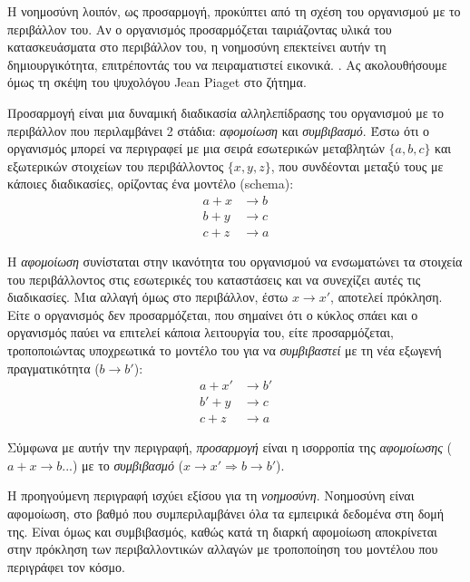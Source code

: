   Η νοημοσύνη λοιπόν, ως προσαρμογή, προκύπτει από τη σχέση του οργανισμού με το περιβάλλον του.
  Αν ο οργανισμός προσαρμόζεται ταιριάζοντας υλικά του κατασκευάσματα στο περιβάλλον του, η νοημοσύνη επεκτείνει αυτήν τη δημιουργικότητα, επιτρέποντάς του να πειραματιστεί εικονικά.
  \parencite[σελ 3]{piagetOriginsIntelligenceChildren1952}.
  Ας ακολουθήσουμε όμως τη σκέψη του ψυχολόγου Jean Piaget στο ζήτημα.

  Προσαρμογή είναι μια δυναμική διαδικασία αλληλεπίδρασης του οργανισμού με το περιβάλλον που περιλαμβάνει 2 στάδια: \textit{αφομοίωση} και \textit{συμβιβασμό}.
  Έστω ότι ο οργανισμός μπορεί να περιγραφεί με μια σειρά εσωτερικών μεταβλητών $\{a,b,c\}$ και εξωτερικών στοιχείων του περιβάλλοντος $\{x,y,z\}$,
  που συνδέονται μεταξύ τους με κάποιες διαδικασίες, ορίζοντας ένα μοντέλο (schema):
  \begin{align*}
    a + x &\rightarrow b\\
    b + y &\rightarrow c\\
    c + z &\rightarrow a
  \end{align*}

  Η \textit{αφομοίωση} συνίσταται στην ικανότητα του οργανισμού να ενσωματώνει τα στοιχεία του περιβάλλοντος στις εσωτερικές του καταστάσεις και να συνεχίζει αυτές τις διαδικασίες.
  Μια αλλαγή όμως στο περιβάλλον, έστω $x\rightarrow x'$, αποτελεί πρόκληση.
  Είτε ο οργανισμός δεν προσαρμόζεται, που σημαίνει ότι ο κύκλος σπάει και ο οργανισμός παύει να επιτελεί κάποια λειτουργία του,
  είτε προσαρμόζεται, τροποποιώντας υποχρεωτικά το μοντέλο του για να \textit{συμβιβαστεί} με τη νέα εξωγενή πραγματικότητα ($b\rightarrow b'$):
  \begin{align*}
    a  + x' &\rightarrow b'\\
    b' + y  &\rightarrow c\\
    c  + z  &\rightarrow a
  \end{align*}

  Σύμφωνα με αυτήν την περιγραφή, \textit{προσαρμογή} είναι η ισορροπία της \textit{αφομοίωσης} ($a+x\rightarrow b$...) με το \textit{συμβιβασμό} ($x\rightarrow x' \Rightarrow b\rightarrow b'$).

  Η προηγούμενη περιγραφή ισχύει εξίσου για τη \textit{νοημοσύνη}. Νοημοσύνη είναι αφομοίωση, στο βαθμό που συμπεριλαμβάνει όλα τα εμπειρικά δεδομένα στη δομή της.
  Είναι όμως και συμβιβασμός, καθώς κατά τη διαρκή αφομοίωση αποκρίνεται στην πρόκληση των περιβαλλοντικών αλλαγών με τροποποίηση του μοντέλου που περιγράφει τον κόσμο.

